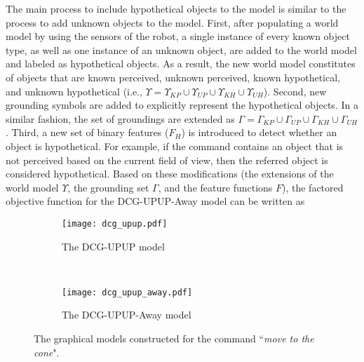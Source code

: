 The main process to include hypothetical objects to the model is similar to the process to add unknown objects to the model. First, after populating a world model by using the sensors of the robot, a single instance of every known object type, as well as one instance of an unknown object, are added to the world model and labeled as hypothetical objects. As a result, the new world model constitutes of objects that are known perceived, unknown perceived, known hypothetical, and unknown hypothetical (i.e., $\Upsilon = \Upsilon_{KP} \cup \Upsilon_{UP} \cup \Upsilon_{KH} \cup \Upsilon_{UH}$). Second, new grounding symbols are added to explicitly represent the hypothetical objects. In a similar fashion, the set of groundings are extended as $\Gamma = \Gamma_{KP} \cup \Gamma_{UP} \cup \Gamma_{KH} \cup \Gamma_{UH}$. Third, a new set of binary features ($F_H$) is introduced to detect whether an object is hypothetical. For example, if the command contains an object that is not perceived based on the current field of view, then the referred object is considered hypothetical. Based on these modifications (the extensions of the world model $\Upsilon$, the grounding set $\Gamma$, and the feature functions $F$), the factored objective function for the DCG-UPUP-Away model can be written as


\begin{figure*}
\centering
\begin{subfigure}[t]{0.40\textwidth}
\centering
\texttt{[image: dcg\_upup.pdf]}
\caption{The DCG-UPUP model}
\label{fig:dcg-upup}
\end{subfigure}
~~~~
\begin{subfigure}[t]{0.52\textwidth}
\centering
\texttt{[image: dcg\_upup\_away.pdf]}
\caption{The DCG-UPUP-Away model}
\label{fig:dcg-upup-away}
\end{subfigure}
\caption{The graphical models constructed for the command ``\emph{move to the cone}".}
\end{figure*}


